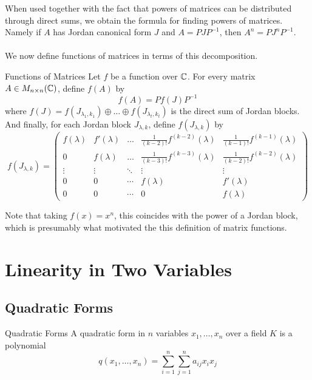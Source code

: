 \documentclass[a4paper]{article}
\begin{document}
When used together with the fact that powers of matrices can be distributed through direct sums, we obtain the formula for finding powers of matrices. Namely if $A$ has Jordan canonical form $J$ and $A=PJP^{-1}$, then $A^n=PJ^nP^{-1}$. \\~\\

We now define functions of matrices in terms of this decomposition. 

\begin{defn}{Functions of Matrices}{} Let $f$ be a function over $\mathbb{C}$. For every matrix $A\in M_{n\times n}(\mathbb{C})$, define $f(A)$ by $$f(A)=Pf(J)P^{-1}$$ where $f(J)=f(J_{\lambda_1,k_1})\oplus\dots\oplus f(J_{\lambda_t,k_t})$ is the direct sum of Jordan blocks. And finally, for each Jordan block $J_{\lambda,k}$, define $f(J_{\lambda,k})$ by $$f(J_{\lambda,k})=\begin{pmatrix}
f(\lambda) & f'(\lambda) & \dots & \frac{1}{(k-2)!}f^{(k-2)}(\lambda) & \frac{1}{(k-1)!}f^{(k-1)}(\lambda)\\
0 & f(\lambda) & \dots & \frac{1}{(k-3)!}f^{(k-3)}(\lambda) & \frac{1}{(k-2)!}f^{(k-2)}(\lambda)\\
\vdots & \vdots & \ddots & \vdots & \vdots\\
0 & 0 & \cdots & f(\lambda) & f'(\lambda)\\
0 & 0 & \cdots & 0 & f(\lambda)
\end{pmatrix}$$
\end{defn}

Note that taking $f(x)=x^n$, this coincides with the power of a Jordan block, which is presumably what motivated the this definition of matrix functions. 

\pagebreak
\section{Linearity in Two Variables}
\subsection{Quadratic Forms}
\begin{defn}{Quadratic Forms}{} A quadratic form in $n$ variables $x_1,\dots,x_n$ over a field $K$ is a polynomial $$q(x_1,\dots,x_n)=\sum_{i=1}^n\sum_{j=1}^na_{ij}x_ix_j$$
\end{defn}
\end{document}
